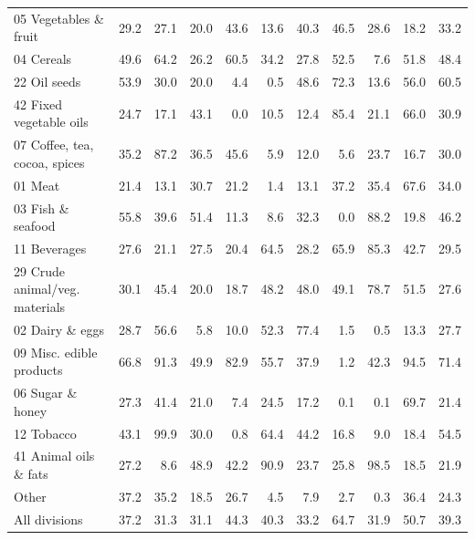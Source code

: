 \begin{tabular}{lrrrrrrrrrr}
05 Vegetables \& fruit & 29.2 & 27.1 & 20.0 & 43.6 & 13.6 & 40.3 & 46.5 & 28.6 & 18.2 & 33.2 \\
04 Cereals & 49.6 & 64.2 & 26.2 & 60.5 & 34.2 & 27.8 & 52.5 & 7.6 & 51.8 & 48.4 \\
22 Oil seeds & 53.9 & 30.0 & 20.0 & 4.4 & 0.5 & 48.6 & 72.3 & 13.6 & 56.0 & 60.5 \\
42 Fixed vegetable oils & 24.7 & 17.1 & 43.1 & 0.0 & 10.5 & 12.4 & 85.4 & 21.1 & 66.0 & 30.9 \\
07 Coffee, tea, cocoa, spices & 35.2 & 87.2 & 36.5 & 45.6 & 5.9 & 12.0 & 5.6 & 23.7 & 16.7 & 30.0 \\
01 Meat & 21.4 & 13.1 & 30.7 & 21.2 & 1.4 & 13.1 & 37.2 & 35.4 & 67.6 & 34.0 \\
03 Fish \& seafood & 55.8 & 39.6 & 51.4 & 11.3 & 8.6 & 32.3 & 0.0 & 88.2 & 19.8 & 46.2 \\
11 Beverages & 27.6 & 21.1 & 27.5 & 20.4 & 64.5 & 28.2 & 65.9 & 85.3 & 42.7 & 29.5 \\
29 Crude animal/veg. materials & 30.1 & 45.4 & 20.0 & 18.7 & 48.2 & 48.0 & 49.1 & 78.7 & 51.5 & 27.6 \\
02 Dairy \& eggs & 28.7 & 56.6 & 5.8 & 10.0 & 52.3 & 77.4 & 1.5 & 0.5 & 13.3 & 27.7 \\
09 Misc. edible products & 66.8 & 91.3 & 49.9 & 82.9 & 55.7 & 37.9 & 1.2 & 42.3 & 94.5 & 71.4 \\
06 Sugar \& honey & 27.3 & 41.4 & 21.0 & 7.4 & 24.5 & 17.2 & 0.1 & 0.1 & 69.7 & 21.4 \\
12 Tobacco & 43.1 & 99.9 & 30.0 & 0.8 & 64.4 & 44.2 & 16.8 & 9.0 & 18.4 & 54.5 \\
41 Animal oils \& fats & 27.2 & 8.6 & 48.9 & 42.2 & 90.9 & 23.7 & 25.8 & 98.5 & 18.5 & 21.9 \\
Other & 37.2 & 35.2 & 18.5 & 26.7 & 4.5 & 7.9 & 2.7 & 0.3 & 36.4 & 24.3 \\
All divisions & 37.2 & 31.3 & 31.1 & 44.3 & 40.3 & 33.2 & 64.7 & 31.9 & 50.7 & 39.3 \\
\bottomrule
\end{tabular}
